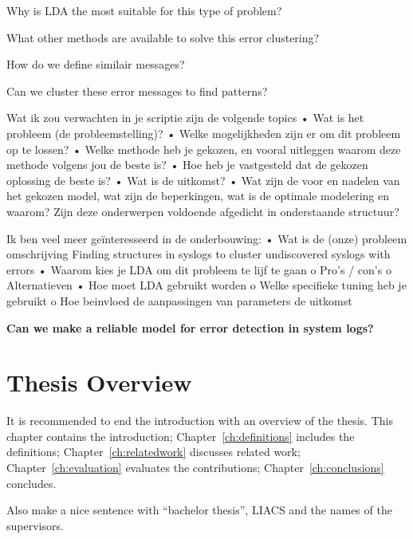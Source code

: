 Why is LDA the most suitable for this type of problem?

What other methods are available to solve this error clustering?





How do we define similair messages?

Can we cluster these error messages to find patterns?

Wat ik zou verwachten in je scriptie zijn de volgende topics
•	Wat is het probleem (de probleemstelling)?
•	Welke mogelijkheden zijn er om dit probleem op te lossen?
•	Welke methode heb je gekozen, en vooral uitleggen waarom deze methode volgens jou de beste is?
•	Hoe heb je vastgesteld dat de gekozen oplossing de beste is?
•	Wat is de uitkomst?
•	Wat zijn de voor en nadelen van het gekozen model, wat zijn de beperkingen, wat is de optimale modelering en waarom?
Zijn deze onderwerpen voldoende afgedicht in onderstaande structuur?

Ik ben veel meer geïnteresseerd in de onderbouwing:
•	Wat is de (onze) probleem omschrijving
Finding structures in syslogs to cluster undiscovered syslogs with errors
•	Waarom kies je LDA om dit probleem te lijf te gaan
o	Pro’s / con’s
o	Alternatieven
•	Hoe moet LDA gebruikt worden
o	Welke specifieke tuning heb je gebruikt
o	Hoe beinvloed de aanpassingen van parameters de uitkomst


\textbf{Can we make a reliable model for error detection in system logs?}

 
\section{Thesis Overview}
It is recommended to end the introduction with an overview of the thesis. This chapter contains the introduction; Chapter~\ref{ch:definitions} includes the definitions; Chapter~\ref{ch:relatedwork} discusses related work; Chapter~\ref{ch:evaluation} evaluates the contributions; Chapter~\ref{ch:conclusions} concludes.

Also make a nice sentence with ``bachelor thesis'', LIACS and the names of the supervisors.

